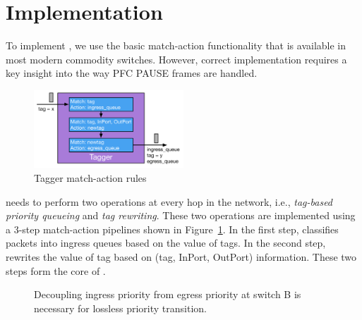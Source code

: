 \section{Implementation}\label{sec:implementation}

To implement \sysname{}, we use the basic match-action functionality that is
available in most modern commodity switches. However, correct implementation
requires a key insight into the way PFC PAUSE frames are handled.

\begin{figure}
	\hspace{-0.2in}
	\centering
	\includegraphics[width=0.5\textwidth] {figs/Tagger}
	\caption{Tagger match-action rules}\label{fig:tagger}
	
\end{figure}

 \sysname{} needs to perform two operations at every
hop in the network, i.e., {\em tag-based priority queueing} and {\em tag
rewriting}.  These two operations are implemented using a 3-step match-action
pipelines shown in Figure~\ref{fig:tagger}.  In the first step, \sysname{}
classifies packets into ingress queues based on the value of tags. In the second
step, \sysname{} rewrites the value of tag based on (tag, InPort, OutPort)
information. These two steps form the core of \sysname{}.

\begin{figure}[t]
 	\centering

 	\caption{Decoupling ingress priority from egress priority at switch B is necessary for lossless priority transition.}\label{fig:prioritydecoupling}
	\vspace{-1em}
\end{figure}

